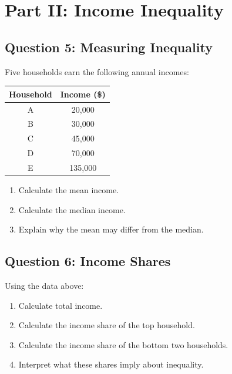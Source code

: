 \documentclass[11pt]{article}
\begin{document}
\section*{Part II: Income Inequality}

\subsection*{Question 5: Measuring Inequality}

Five households earn the following annual incomes:

\begin{center}
\begin{tabular}{cc}
\toprule
Household & Income (\$) \\
\midrule
A & 20,000 \\
B & 30,000 \\
C & 45,000 \\
D & 70,000 \\
E & 135,000 \\
\bottomrule
\end{tabular}
\end{center}

\begin{enumerate}
\item Calculate the mean income.
\item Calculate the median income.
\item Explain why the mean may differ from the median.
\end{enumerate}

\newpage
\subsection*{Question 6: Income Shares}

Using the data above:

\begin{enumerate}
\item Calculate total income.
\item Calculate the income share of the top household.
\item Calculate the income share of the bottom two households.
\item Interpret what these shares imply about inequality.
\end{enumerate}

\end{document}
